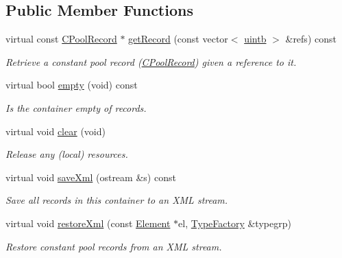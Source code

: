 \subsection*{Public Member Functions}
\begin{DoxyCompactItemize}
\item 
virtual const \mbox{\hyperlink{class_c_pool_record}{C\+Pool\+Record}} $\ast$ \mbox{\hyperlink{class_constant_pool_internal_a28cbe88a2aa77b21bbf7a8027485ad37}{get\+Record}} (const vector$<$ \mbox{\hyperlink{types_8h_a2db313c5d32a12b01d26ac9b3bca178f}{uintb}} $>$ \&refs) const
\begin{DoxyCompactList}\small\item\em Retrieve a constant pool record (\mbox{\hyperlink{class_c_pool_record}{C\+Pool\+Record}}) given a {\itshape reference} to it. \end{DoxyCompactList}\item 
virtual bool \mbox{\hyperlink{class_constant_pool_internal_a4de2decea0379233ebd272c8eb72355d}{empty}} (void) const
\begin{DoxyCompactList}\small\item\em Is the container empty of records. \end{DoxyCompactList}\item 
virtual void \mbox{\hyperlink{class_constant_pool_internal_a72e240485b635c1e82282d1ae0cbd7d5}{clear}} (void)
\begin{DoxyCompactList}\small\item\em Release any (local) resources. \end{DoxyCompactList}\item 
virtual void \mbox{\hyperlink{class_constant_pool_internal_a5386f07fda2fff612dca7acea0ea68ad}{save\+Xml}} (ostream \&s) const
\begin{DoxyCompactList}\small\item\em Save all records in this container to an X\+ML stream. \end{DoxyCompactList}\item 
virtual void \mbox{\hyperlink{class_constant_pool_internal_a28f4bf1f388ac9eb718f1790267b662d}{restore\+Xml}} (const \mbox{\hyperlink{class_element}{Element}} $\ast$el, \mbox{\hyperlink{class_type_factory}{Type\+Factory}} \&typegrp)
\begin{DoxyCompactList}\small\item\em Restore constant pool records from an X\+ML stream. \end{DoxyCompactList}\end{DoxyCompactItemize}


